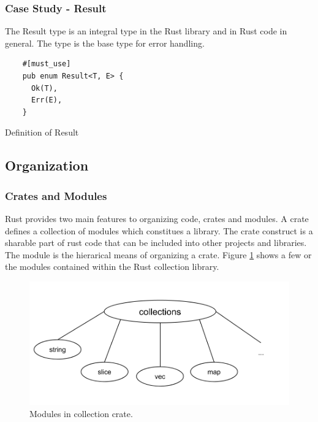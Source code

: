 \subsubsection{Case Study - Result}

The Result type is an integral type in the Rust library and in Rust code in general.
The type is the base type for error handling.

\begin{listing}[H]
  \begin{verbatim}
    #[must_use]
    pub enum Result<T, E> {
      Ok(T),
      Err(E),
    }
\end{verbatim}
\caption{Definition of Result}
\label{lst:rust:result}
\end{listing}

\subsection{Organization}
\label{ssub:rust:organization}

\subsubsection{Crates and Modules}

Rust provides two main features to organizing code, crates and modules.
A crate defines a collection of modules which constitues a library.
The crate construct is a sharable part of rust code that can be included into other projects and libraries.
The module is the hierarical means of organizing a crate.
Figure \ref{fig:rust:collections} shows a few or the modules contained within the Rust collection library.

\begin{figure}[H]
  \begin{center}
    \includegraphics[scale=0.3]{figures/background/rust/libcollections.png}
  \end{center}
  \caption{Modules in collection crate.}
  \label{fig:rust:collections}
\end{figure}

